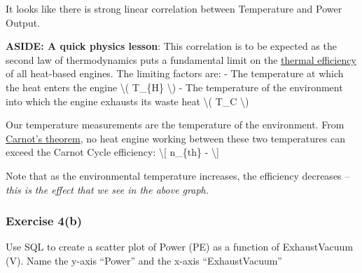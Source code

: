 \documentclass[11pt]{article}
\begin{document}
    It looks like there is strong linear correlation between Temperature and
Power Output.

\textbf{ASIDE: A quick physics lesson}: This correlation is to be
expected as the second law of thermodynamics puts a fundamental limit on
the \href{https://en.wikipedia.org/wiki/Thermal_efficiency}{thermal
efficiency} of all heat-based engines. The limiting factors are: - The
temperature at which the heat enters the engine \textbackslash( T\_\{H\}
\textbackslash) - The temperature of the environment into which the
engine exhausts its waste heat \textbackslash( T\_C \textbackslash)

Our temperature measurements are the temperature of the environment.
From
\href{https://en.wikipedia.org/wiki/Carnot\%27s_theorem_\%28thermodynamics\%29}{Carnot's
theorem}, no heat engine working between these two temperatures can
exceed the Carnot Cycle efficiency: \textbackslash{[} n\_\{th\}  -
 \textbackslash{]}

Note that as the environmental temperature increases, the efficiency
decreases -- \emph{this is the effect that we see in the above graph.}

    \hypertarget{exercise-4b}{%
\subsubsection{Exercise 4(b)}\label{exercise-4b}}

Use SQL to create a scatter plot of Power (PE) as a function of
ExhaustVacuum (V). Name the y-axis ``Power'' and the x-axis
``ExhaustVacuum''
\end{document}
